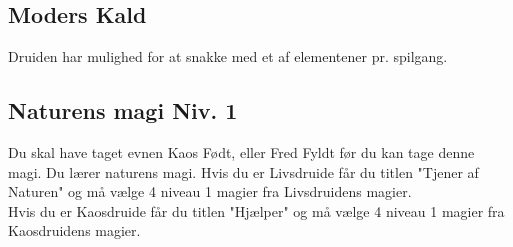 \subsection{Moders Kald}
Druiden har mulighed for at snakke med et af elementener pr. spilgang.

\subsection{Naturens magi Niv. 1}
Du skal have taget evnen Kaos Født, eller Fred Fyldt før du kan tage denne magi. Du lærer naturens magi. Hvis du er Livsdruide får du titlen "Tjener af Naturen" og må vælge 4 niveau 1 magier fra Livsdruidens magier.\\ Hvis du er Kaosdruide får du titlen "Hjælper" og må vælge 4 niveau 1 magier fra Kaosdruidens magier.